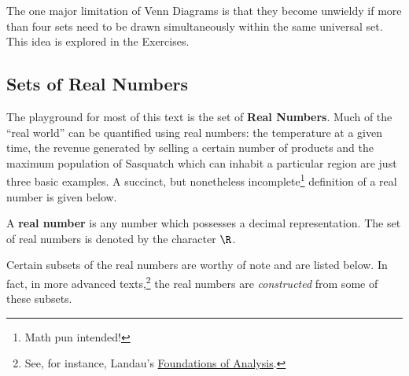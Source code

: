 The one major limitation of Venn Diagrams is that they become unwieldy if more than four sets need to be drawn simultaneously within the same universal set.  This idea is explored in the Exercises.

\subsection{Sets of Real Numbers}
\label{SetsofRealNumbers}

The playground for most of this text is the set of \textbf{Real Numbers}.  Much of the ``real world'' can be quantified using real numbers: the temperature at a given time, the revenue generated by selling a certain number of products and the maximum population of Sasquatch which can inhabit a particular region are just three basic examples.   A succinct, but nonetheless incomplete\footnote{Math pun intended!} definition of a real number is given below.

\medskip

\colorbox{ResultColor}{\bbm

\begin{defn} \label{realnumberdefn}

A \textbf{real number} is any number which possesses a decimal representation.  The set of real numbers is denoted by the character $\R$.  

\end{defn}

\ebm}

\medskip

Certain subsets of the real numbers are worthy of note and are listed below.  In fact, in more advanced texts,\footnote{See, for instance, Landau's \underline{Foundations of Analysis}.}   the real numbers are \textit{constructed} from some of these subsets.  

\medskip

\label{setsofnumbersboxonthispage}

